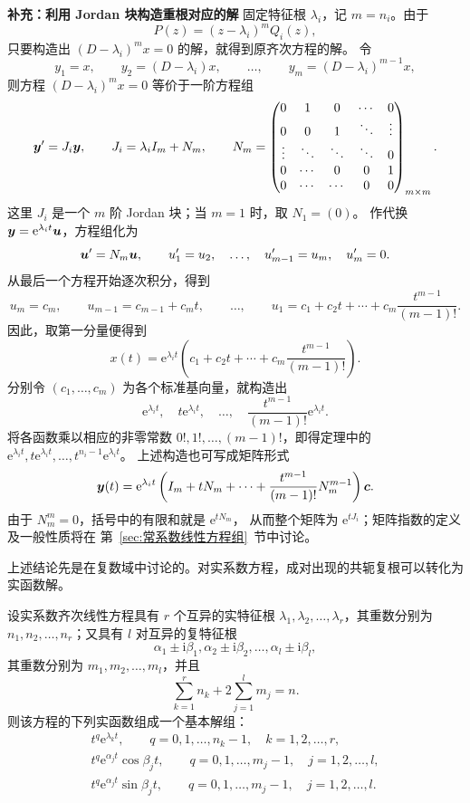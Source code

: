 \noindent\textbf{补充：利用 Jordan 块构造重根对应的解}\quad
固定特征根 $\lambda_i$，记 $m=n_i$。由于
\[
	P(z)=(z-\lambda_i)^mQ_i(z),
\]
只要构造出 $(D-\lambda_i)^mx=0$ 的解，就得到原齐次方程的解。
令
\[
	y_1=x,\qquad y_2=(D-\lambda_i)x,\qquad\ldots,\qquad
	y_m=(D-\lambda_i)^{m-1}x,
\]
则方程 $(D-\lambda_i)^mx=0$ 等价于一阶方程组
\[
	\boldsymbol{y}'=J_i\boldsymbol{y},\qquad
	J_i=\lambda_iI_m+N_m,\qquad
	N_m=
	\begin{pmatrix}
		0&1&0&\cdots&0\\
		0&0&1&\ddots&\vdots\\
		\vdots&\ddots&\ddots&\ddots&0\\
		0&\cdots&0&0&1\\
		0&\cdots&\cdots&0&0
	\end{pmatrix}_{m\times m}.
\]
这里 $J_i$ 是一个 $m$ 阶 Jordan 块；当 $m=1$ 时，取 $N_1=(0)$。
作代换 $\boldsymbol{y}=\mathrm{e}^{\lambda_it}\boldsymbol{u}$，方程组化为
\[
	\boldsymbol{u}'=N_m\boldsymbol{u},
	\qquad
	u_1'=u_2,\quad\ldots,\quad u_{m-1}'=u_m,\quad u_m'=0.
\]
从最后一个方程开始逐次积分，得到
\[
	u_m=c_m,\qquad u_{m-1}=c_{m-1}+c_mt,\qquad\ldots,\qquad
	u_1=c_1+c_2t+\cdots+c_m\dfrac{t^{m-1}}{(m-1)!}.
\]
因此，取第一分量便得到
\[
	x(t)=\mathrm{e}^{\lambda_it}
	\left(c_1+c_2t+\cdots+c_m\dfrac{t^{m-1}}{(m-1)!}\right).
\]
分别令 $(c_1,\ldots,c_m)$ 为各个标准基向量，就构造出
\[
	\mathrm{e}^{\lambda_it},\quad
	t\mathrm{e}^{\lambda_it},\quad\ldots,\quad
	\dfrac{t^{m-1}}{(m-1)!}\mathrm{e}^{\lambda_it}.
\]
将各函数乘以相应的非零常数 $0!,1!,\ldots,(m-1)!$，即得定理中的
$\mathrm{e}^{\lambda_it},t\mathrm{e}^{\lambda_it},\ldots,
t^{n_i-1}\mathrm{e}^{\lambda_it}$。
上述构造也可写成矩阵形式
\[
	\boldsymbol{y}(t)=\mathrm{e}^{\lambda_it}
	\left(I_m+tN_m+\cdots+\dfrac{t^{m-1}}{(m-1)!}N_m^{m-1}\right)\boldsymbol{c}.
\]
由于 $N_m^m=0$，括号中的有限和就是 $\mathrm{e}^{tN_m}$，
从而整个矩阵为 $\mathrm{e}^{tJ_i}$；矩阵指数的定义及一般性质将在
第~\ref{sec:常系数线性方程组}~节中讨论。

上述结论先是在复数域中讨论的。对实系数方程，成对出现的共轭复根可以转化为实函数解。

\begin{corollary}\label{cor:实系数常系数方程的基本解组}
	设实系数齐次线性方程具有 $r$ 个互异的实特征根
	$\lambda_1,\lambda_2,\ldots,\lambda_r$，其重数分别为
	$n_1,n_2,\ldots,n_r$；又具有 $l$ 对互异的复特征根
	\[
		\alpha_1\pm\mathrm{i}\beta_1,
		\alpha_2\pm\mathrm{i}\beta_2,
		\ldots,
		\alpha_l\pm\mathrm{i}\beta_l,
	\]
	其重数分别为 $m_1,m_2,\ldots,m_l$，并且
	\[
		\sum_{k=1}^{r}n_k+2\sum_{j=1}^{l}m_j=n.
	\]
	则该方程的下列实函数组成一个基本解组：
	\[
		\begin{gathered}
			t^q\mathrm{e}^{\lambda_kt},
			\qquad q=0,1,\ldots,n_k-1,
			\quad k=1,2,\ldots,r,\\
			t^q\mathrm{e}^{\alpha_jt}\cos\beta_jt,
			\qquad q=0,1,\ldots,m_j-1,
			\quad j=1,2,\ldots,l,\\
			t^q\mathrm{e}^{\alpha_jt}\sin\beta_jt,
			\qquad q=0,1,\ldots,m_j-1,
			\quad j=1,2,\ldots,l.
		\end{gathered}
	\]
\end{corollary}

